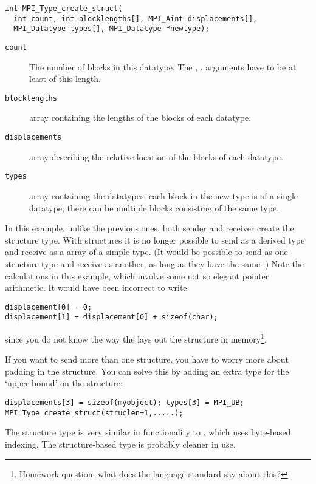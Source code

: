 \begin{lstlisting}
int MPI_Type_create_struct(
  int count, int blocklengths[], MPI_Aint displacements[],
  MPI_Datatype types[], MPI_Datatype *newtype);
\end{lstlisting}

\begin{description}
\item[\texttt{count}] The number of blocks in this
  datatype. The , , 
  arguments have to be at least of this length.
\item[\texttt{blocklengths}] array containing the lengths of the blocks of each datatype.
\item[\texttt{displacements}] array describing the relative location
  of the blocks of each datatype.
\item[\texttt{types}] array containing the datatypes; each block in
  the new type is of a single datatype; there can be multiple
  blocks consisting of the same type.
\end{description}
In this example, unlike the previous ones, both sender and receiver
create the structure type. With structures it is no longer possible to
send as a derived type and receive as a array of a simple type.
(It would be possible to send as one structure type and receive as another, 
as long as they have the same .)
%
%
Note the  calculations in this example,
which involve some not so elegant pointer arithmetic.
It would have been incorrect to write
\begin{lstlisting}
displacement[0] = 0;
displacement[1] = displacement[0] + sizeof(char);
\end{lstlisting}
since you do not know the way the  lays out the
structure in memory\footnote{Homework question: what does the language
  standard say about this?}.

If you want to send more than one structure, you have to worry more
about padding in the structure. You can solve this by adding an extra
type  for the `upper bound' on the structure:
\begin{lstlisting}
displacements[3] = sizeof(myobject); types[3] = MPI_UB;
MPI_Type_create_struct(struclen+1,.....);
\end{lstlisting}

The structure type is very similar in functionality to ,
which uses byte-based indexing. The structure-based type is probably cleaner
in use.

